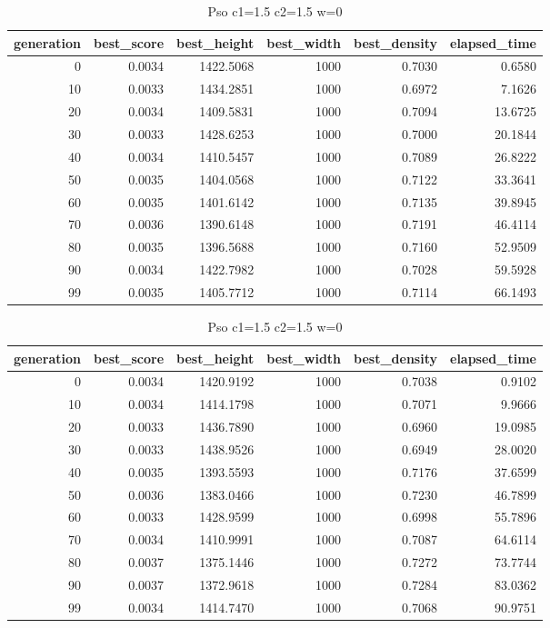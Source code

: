\begin{table}[htbp]
    \centering
    \caption{Pso c1=1.5 c2=1.5 w=0}
    \label{tab:pso_c1_1_5_c2_1_5_w_0}
    \begin{tabular}{rrrrrr}
    \toprule
    generation & best_score & best_height & best_width & best_density & elapsed_time \\
    \midrule
    0 & 0.0034 & 1422.5068 & 1000 & 0.7030 & 0.6580 \\
    10 & 0.0033 & 1434.2851 & 1000 & 0.6972 & 7.1626 \\
    20 & 0.0034 & 1409.5831 & 1000 & 0.7094 & 13.6725 \\
    30 & 0.0033 & 1428.6253 & 1000 & 0.7000 & 20.1844 \\
    40 & 0.0034 & 1410.5457 & 1000 & 0.7089 & 26.8222 \\
    50 & 0.0035 & 1404.0568 & 1000 & 0.7122 & 33.3641 \\
    60 & 0.0035 & 1401.6142 & 1000 & 0.7135 & 39.8945 \\
    70 & 0.0036 & 1390.6148 & 1000 & 0.7191 & 46.4114 \\
    80 & 0.0035 & 1396.5688 & 1000 & 0.7160 & 52.9509 \\
    90 & 0.0034 & 1422.7982 & 1000 & 0.7028 & 59.5928 \\
    99 & 0.0035 & 1405.7712 & 1000 & 0.7114 & 66.1493 \\
    \bottomrule
    \end{tabular}
\end{table}


\begin{table}[htbp]
    \centering
    \caption{Pso c1=1.5 c2=1.5 w=0}
    \label{tab:pso_c1_1_5_c2_1_5_w_0}
    \begin{tabular}{rrrrrr}
    \toprule
    generation & best_score & best_height & best_width & best_density & elapsed_time \\
    \midrule
    0 & 0.0034 & 1420.9192 & 1000 & 0.7038 & 0.9102 \\
    10 & 0.0034 & 1414.1798 & 1000 & 0.7071 & 9.9666 \\
    20 & 0.0033 & 1436.7890 & 1000 & 0.6960 & 19.0985 \\
    30 & 0.0033 & 1438.9526 & 1000 & 0.6949 & 28.0020 \\
    40 & 0.0035 & 1393.5593 & 1000 & 0.7176 & 37.6599 \\
    50 & 0.0036 & 1383.0466 & 1000 & 0.7230 & 46.7899 \\
    60 & 0.0033 & 1428.9599 & 1000 & 0.6998 & 55.7896 \\
    70 & 0.0034 & 1410.9991 & 1000 & 0.7087 & 64.6114 \\
    80 & 0.0037 & 1375.1446 & 1000 & 0.7272 & 73.7744 \\
    90 & 0.0037 & 1372.9618 & 1000 & 0.7284 & 83.0362 \\
    99 & 0.0034 & 1414.7470 & 1000 & 0.7068 & 90.9751 \\
    \bottomrule
    \end{tabular}
\end{table}


